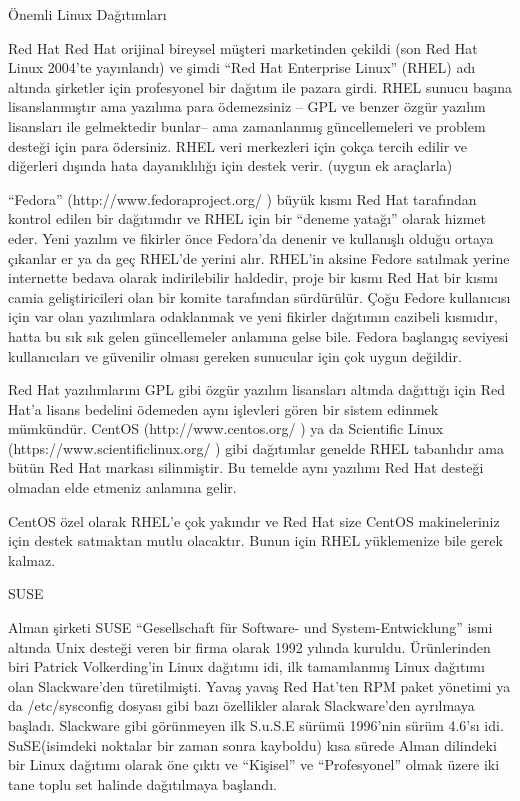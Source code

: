 \begin{section}{Önemli Linux Dağıtımları}
\begin{subsection}{Red Hat}
Red Hat orijinal bireysel müşteri marketinden çekildi (son Red Hat Linux 2004'te yayınlandı) ve şimdi “Red Hat Enterprise Linux” (RHEL) adı altında şirketler için profesyonel bir dağıtım ile pazara girdi. RHEL sunucu başına lisanslanmıştır ama yazılıma para ödemezsiniz – GPL ve benzer özgür yazılım lisansları ile gelmektedir bunlar-- ama zamanlanmış güncellemeleri ve problem desteği için para ödersiniz. RHEL veri merkezleri için çokça tercih edilir ve diğerleri dışında hata dayanıklılığı için destek verir. (uygun ek araçlarla)

“Fedora” (http://www.fedoraproject.org/ ) büyük kısmı Red Hat tarafından kontrol edilen bir dağıtımdır ve RHEL için bir “deneme yatağı” olarak hizmet eder. Yeni yazılım ve fikirler önce Fedora'da denenir ve kullanışlı olduğu ortaya çıkanlar er ya da geç RHEL'de yerini alır. RHEL'in aksine Fedore satılmak yerine internette bedava olarak indirilebilir haldedir, proje bir kısmı Red Hat bir kısmı camia geliştiricileri olan bir komite tarafından sürdürülür. Çoğu Fedore kullanıcısı için var olan yazılımlara odaklanmak ve yeni fikirler dağıtımın cazibeli kısmıdır, hatta bu sık sık gelen güncellemeler anlamına gelse bile. Fedora başlangıç seviyesi kullanıcıları ve güvenilir olması gereken sunucular için çok uygun değildir.

Red Hat yazılımlarını GPL gibi özgür yazılım lisansları altında dağıttığı için Red Hat'a lisans bedelini ödemeden aynı işlevleri gören bir sistem edinmek mümkündür. CentOS (http://www.centos.org/ ) ya da Scientific Linux (https://www.scientificlinux.org/ ) gibi dağıtımlar genelde RHEL tabanlıdır ama bütün Red Hat markası silinmiştir. Bu temelde aynı yazılımı Red Hat desteği olmadan elde etmeniz anlamına gelir.

CentOS özel olarak RHEL'e çok yakındır ve Red Hat size CentOS makineleriniz için destek satmaktan mutlu olacaktır. Bunun için RHEL yüklemenize bile gerek kalmaz.

\end{subsection}
\begin{subsection}{SUSE}

Alman şirketi SUSE “Gesellschaft für Software- und System-Entwicklung” ismi altında Unix desteği veren bir firma olarak 1992 yılında kuruldu. Ürünlerinden biri Patrick Volkerding’in Linux dağıtımı idi, ilk tamamlanmış Linux dağıtımı olan Slackware'den türetilmişti. Yavaş yavaş Red Hat'ten RPM paket yönetimi ya da /etc/sysconfig dosyası gibi bazı özellikler alarak Slackware'den ayrılmaya başladı. Slackware gibi görünmeyen ilk S.u.S.E sürümü 1996'nin sürüm 4.6'sı idi. SuSE(isimdeki noktalar bir zaman sonra kayboldu) kısa sürede Alman dilindeki bir Linux dağıtımı olarak öne çıktı ve “Kişisel” ve “Profesyonel” olmak üzere iki tane toplu set halinde dağıtılmaya başlandı.


\end{subsection}
\end{section}
